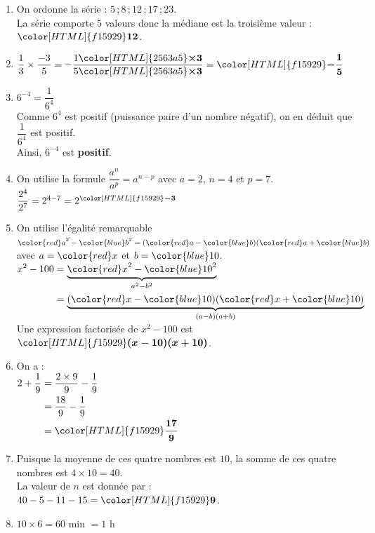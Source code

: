 \documentclass[a4paper,11pt,landscape,exos]{nsi} %
\begin{document}
\begin{multicols}{2}
\begin{enumerate}[]
\item On ordonne la série :  $5$\,;\,$8$\,;\,$12$\,;\,$17$\,;\,$23$.\\
      La série comporte $5$ valeurs donc la médiane est la troisième valeur : ${\color[HTML]{f15929}\boldsymbol{12}}$.
\item $\dfrac{1}{3}\times \dfrac{-3}{5}=-\dfrac{1{\color[HTML]{2563a5}\boldsymbol{\times3}} }{5{\color[HTML]{2563a5}\boldsymbol{\times3}}}={\color[HTML]{f15929}\boldsymbol{-\dfrac{1}{5}}}$
\item $6^{-4}=\dfrac{1}{6^{4}}$\\
     Comme  $6^{4}$ est  positif (puissance paire d'un nombre négatif), on en déduit que  $\dfrac{1}{6^{4}}$ est positif.\\
    Ainsi, $6^{-4}$ est {\bfseries \color[HTML]{f15929}positif}.
\item On utilise la formule $\dfrac{a^n}{a^p}=a^{n - p}$
        avec $a=2$,  $n=4$ et $p=7$.\\
        $\dfrac{2^{4}}{2^{7}}=2^{4-7}=2^{{\color[HTML]{f15929}\boldsymbol{-3}}}$
\item On utilise l'égalité remarquable ${\color{red} a}^2-{\color{blue} b}^2=({\color{red} a}-{\color{blue} b})({\color{red} a}+{\color{blue} b})$ avec $a={\color{red} x}$  et $b={\color{blue} 10}$.\\$\begin{aligned}
 x^2-100&=\underbrace{{\color{red} x}^2-{\color{blue} 10}^2}_{a^2-b^2}\\
 &=\underbrace{({\color{red} x}-{\color{blue} 10})({\color{red} x}+{\color{blue} 10})}_{(a-b)(a+b)}
 \end{aligned}$ \\
    Une expression factorisée de $x^2-100$ est ${\color[HTML]{f15929}\boldsymbol{(x-10)(x+10)}}$.
\item On a : \\$\begin{aligned}
      2+\dfrac{1}{9} &= \dfrac{2 \times 9}{9} - \dfrac{1}{9} \\
      &= \dfrac{18}{9} - \dfrac{1}{9}\\
      &  ={\color[HTML]{f15929}\boldsymbol{\dfrac{17}{9}}}
      \end{aligned}$
\item Puisque la moyenne de ces quatre nombres est $10$, la somme de ces quatre nombres est $4\times 10=40$.\\
             La valeur de $n$ est donnée par :  $40-5-11-15={\color[HTML]{f15929}\boldsymbol{9}}$.
\item $10\times 6= 60$ min $=1$ h\\

\end{enumerate}
\end{multicols}
\end{document}
